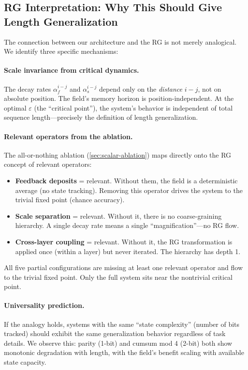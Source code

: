 \documentclass[11pt,a4paper]{article}
\newcommand{\evap}{\varepsilon}
\newcommand{\retain}{\alpha}
\begin{document}
\subsection{RG Interpretation: Why This Should Give Length Generalization}
\label{sec:rg-interpretation}

The connection between our architecture and the RG is not merely
analogical.  We identify three specific mechanisms:

\paragraph{Scale invariance from critical dynamics.}  The decay
rates $\retain_f^{i-j}$ and $\retain_s^{i-j}$ depend only on
the \emph{distance} $i - j$, not on absolute position.  The field's
memory horizon is position-independent.  At the optimal $\evap$
(the ``critical point''), the system's behavior is independent of
total sequence length---precisely the definition of length
generalization.

\paragraph{Relevant operators from the ablation.}  The
all-or-nothing ablation (\cref{sec:scalar-ablation}) maps directly
onto the RG concept of relevant operators:
\begin{itemize}
  \item \textbf{Feedback deposits} = relevant.  Without them, the
    field is a deterministic average (no state tracking).  Removing
    this operator drives the system to the trivial fixed point
    (chance accuracy).
  \item \textbf{Scale separation} = relevant.  Without it, there is
    no coarse-graining hierarchy.  A single decay rate means a single
    ``magnification''---no RG flow.
  \item \textbf{Cross-layer coupling} = relevant.  Without it, the
    RG transformation is applied once (within a layer) but never
    iterated.  The hierarchy has depth 1.
\end{itemize}
All five partial configurations are missing at least one relevant
operator and flow to the trivial fixed point.  Only the full system
sits near the nontrivial critical point.

\paragraph{Universality prediction.}  If the analogy holds, systems
with the same ``state complexity'' (number of bits tracked) should
exhibit the same generalization behavior regardless of task details.
We observe this: parity (1-bit) and cumsum mod 4 (2-bit) both show
monotonic degradation with length, with the field's benefit scaling
with available state capacity.
\end{document}
